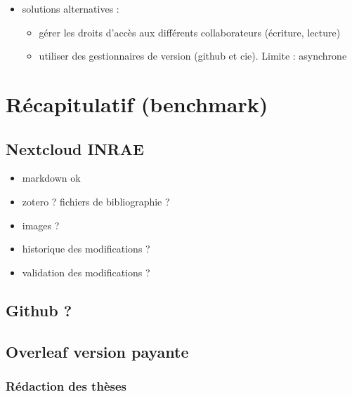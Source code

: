 \documentclass[
]{article}
\providecommand{\tightlist}{%
  \setlength{\itemsep}{0pt}\setlength{\parskip}{0pt}}
\begin{document}
\begin{itemize}
\tightlist
\item
  solutions alternatives :

  \begin{itemize}
  \tightlist
  \item
    gérer les droits d'accès aux différents collaborateurs (écriture,
    lecture)
  \item
    utiliser des gestionnaires de version (github et cie). Limite :
    asynchrone
  \end{itemize}
\end{itemize}

\hypertarget{ruxe9capitulatif-benchmark}{%
\section{Récapitulatif (benchmark)}\label{ruxe9capitulatif-benchmark}}

\hypertarget{nextcloud-inrae}{%
\subsection{Nextcloud INRAE}\label{nextcloud-inrae}}

\begin{itemize}
\tightlist
\item
  markdown ok
\item
  zotero ? fichiers de bibliographie ?
\item
  images ?
\item
  historique des modifications ?
\item
  validation des modifications ?
\end{itemize}

\hypertarget{github}{%
\subsection{Github ?}\label{github}}

\hypertarget{overleaf-version-payante}{%
\subsection{Overleaf version payante}\label{overleaf-version-payante}}

\hypertarget{ruxe9daction-des-thuxe8ses}{%
\subsubsection{Rédaction des thèses}\label{ruxe9daction-des-thuxe8ses}}
\end{document}
